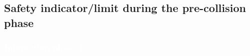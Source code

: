 %
%
%




\subsection{Safety indicator/limit during the pre-collision phase}
\begin{frame}
\frametitle{{\textcolor{white}{\hspace{0.3cm}Interaction phase 1}}}
\begin{center}     
{\fontsize{25}{60} }
\end{center}             
\end{frame}

